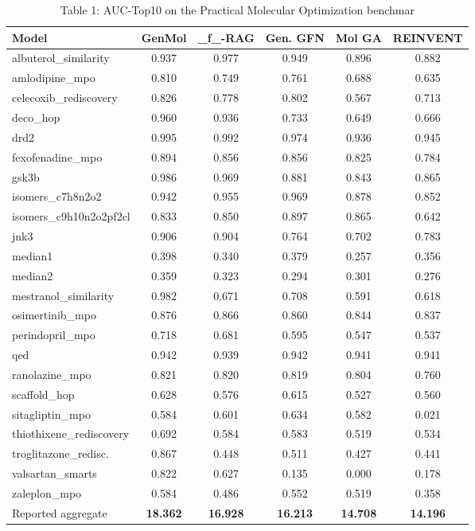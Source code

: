 \begin{table}[t]
\centering
\caption{Table 1: AUC-Top10 on the Practical Molecular Optimization benchmar}
\label{tab:2610.18438}
\begin{tabular}{lccccc}
\toprule
Model & GenMol & \_f\_-RAG & Gen. GFN & Mol GA & REINVENT \\
\midrule
albuterol_similarity & 0.937 & 0.977 & 0.949 & 0.896 & 0.882 \\
amlodipine_mpo & 0.810 & 0.749 & 0.761 & 0.688 & 0.635 \\
celecoxib_rediscovery & 0.826 & 0.778 & 0.802 & 0.567 & 0.713 \\
deco_hop & 0.960 & 0.936 & 0.733 & 0.649 & 0.666 \\
drd2 & 0.995 & 0.992 & 0.974 & 0.936 & 0.945 \\
fexofenadine_mpo & 0.894 & 0.856 & 0.856 & 0.825 & 0.784 \\
gsk3b & 0.986 & 0.969 & 0.881 & 0.843 & 0.865 \\
isomers_c7h8n2o2 & 0.942 & 0.955 & 0.969 & 0.878 & 0.852 \\
isomers_c9h10n2o2pf2cl & 0.833 & 0.850 & 0.897 & 0.865 & 0.642 \\
jnk3 & 0.906 & 0.904 & 0.764 & 0.702 & 0.783 \\
median1 & 0.398 & 0.340 & 0.379 & 0.257 & 0.356 \\
median2 & 0.359 & 0.323 & 0.294 & 0.301 & 0.276 \\
mestranol_similarity & 0.982 & 0.671 & 0.708 & 0.591 & 0.618 \\
osimertinib_mpo & 0.876 & 0.866 & 0.860 & 0.844 & 0.837 \\
perindopril_mpo & 0.718 & 0.681 & 0.595 & 0.547 & 0.537 \\
qed & 0.942 & 0.939 & 0.942 & 0.941 & 0.941 \\
ranolazine_mpo & 0.821 & 0.820 & 0.819 & 0.804 & 0.760 \\
scaffold_hop & 0.628 & 0.576 & 0.615 & 0.527 & 0.560 \\
sitagliptin_mpo & 0.584 & 0.601 & 0.634 & 0.582 & 0.021 \\
thiothixene_rediscovery & 0.692 & 0.584 & 0.583 & 0.519 & 0.534 \\
troglitazone_redisc. & 0.867 & 0.448 & 0.511 & 0.427 & 0.441 \\
valsartan_smarts & 0.822 & 0.627 & 0.135 & 0.000 & 0.178 \\
zaleplon_mpo & 0.584 & 0.486 & 0.552 & 0.519 & 0.358 \\
Reported aggregate & \textbf{18.362} & \textbf{16.928} & \textbf{16.213} & \textbf{14.708} & \textbf{14.196} \\
\bottomrule
\end{tabular}
\end{table}
